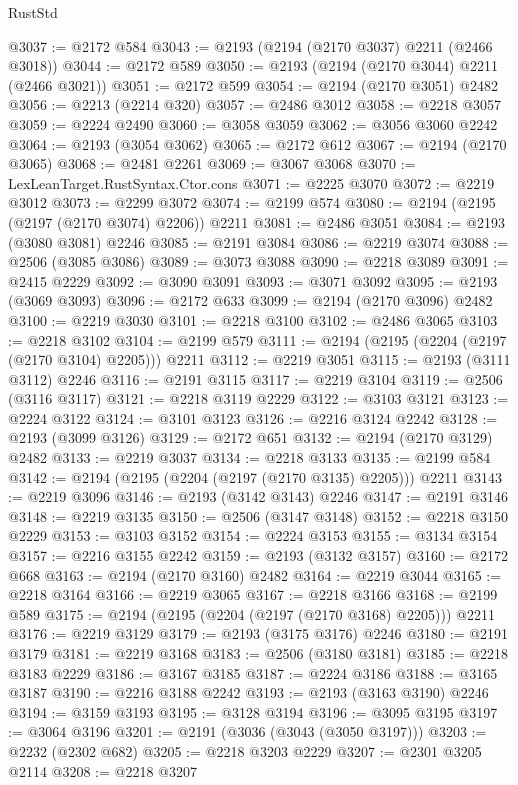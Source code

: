 \begin{lexlean}{RustStd}
\begin{coremodule}
@3037 := @2172 @584
@3043 := @2193 (@2194 (@2170 @3037) @2211 (@2466 @3018))
@3044 := @2172 @589
@3050 := @2193 (@2194 (@2170 @3044) @2211 (@2466 @3021))
@3051 := @2172 @599
@3054 := @2194 (@2170 @3051) @2482
@3056 := @2213 (@2214 @320)
@3057 := @2486 @3012
@3058 := @2218 @3057
@3059 := @2224 @2490
@3060 := @3058 @3059
@3062 := @3056 @3060 @2242
@3064 := @2193 (@3054 @3062)
@3065 := @2172 @612
@3067 := @2194 (@2170 @3065)
@3068 := @2481 @2261
@3069 := @3067 @3068
@3070 := LexLeanTarget.RustSyntax.Ctor.cons
@3071 := @2225 @3070
@3072 := @2219 @3012
@3073 := @2299 @3072
@3074 := @2199 @574
@3080 := @2194 (@2195 (@2197 (@2170 @3074) @2206)) @2211
@3081 := @2486 @3051
@3084 := @2193 (@3080 @3081) @2246
@3085 := @2191 @3084
@3086 := @2219 @3074
@3088 := @2506 (@3085 @3086)
@3089 := @3073 @3088
@3090 := @2218 @3089
@3091 := @2415 @2229
@3092 := @3090 @3091
@3093 := @3071 @3092
@3095 := @2193 (@3069 @3093)
@3096 := @2172 @633
@3099 := @2194 (@2170 @3096) @2482
@3100 := @2219 @3030
@3101 := @2218 @3100
@3102 := @2486 @3065
@3103 := @2218 @3102
@3104 := @2199 @579
@3111 := @2194 (@2195 (@2204 (@2197 (@2170 @3104) @2205))) @2211
@3112 := @2219 @3051
@3115 := @2193 (@3111 @3112) @2246
@3116 := @2191 @3115
@3117 := @2219 @3104
@3119 := @2506 (@3116 @3117)
@3121 := @2218 @3119 @2229
@3122 := @3103 @3121
@3123 := @2224 @3122
@3124 := @3101 @3123
@3126 := @2216 @3124 @2242
@3128 := @2193 (@3099 @3126)
@3129 := @2172 @651
@3132 := @2194 (@2170 @3129) @2482
@3133 := @2219 @3037
@3134 := @2218 @3133
@3135 := @2199 @584
@3142 := @2194 (@2195 (@2204 (@2197 (@2170 @3135) @2205))) @2211
@3143 := @2219 @3096
@3146 := @2193 (@3142 @3143) @2246
@3147 := @2191 @3146
@3148 := @2219 @3135
@3150 := @2506 (@3147 @3148)
@3152 := @2218 @3150 @2229
@3153 := @3103 @3152
@3154 := @2224 @3153
@3155 := @3134 @3154
@3157 := @2216 @3155 @2242
@3159 := @2193 (@3132 @3157)
@3160 := @2172 @668
@3163 := @2194 (@2170 @3160) @2482
@3164 := @2219 @3044
@3165 := @2218 @3164
@3166 := @2219 @3065
@3167 := @2218 @3166
@3168 := @2199 @589
@3175 := @2194 (@2195 (@2204 (@2197 (@2170 @3168) @2205))) @2211
@3176 := @2219 @3129
@3179 := @2193 (@3175 @3176) @2246
@3180 := @2191 @3179
@3181 := @2219 @3168
@3183 := @2506 (@3180 @3181)
@3185 := @2218 @3183 @2229
@3186 := @3167 @3185
@3187 := @2224 @3186
@3188 := @3165 @3187
@3190 := @2216 @3188 @2242
@3193 := @2193 (@3163 @3190) @2246
@3194 := @3159 @3193
@3195 := @3128 @3194
@3196 := @3095 @3195
@3197 := @3064 @3196
@3201 := @2191 (@3036 (@3043 (@3050 @3197)))
@3203 := @2232 (@2302 @682)
@3205 := @2218 @3203 @2229
@3207 := @2301 @3205 @2114
@3208 := @2218 @3207

\end{coremodule}
\end{lexlean}
